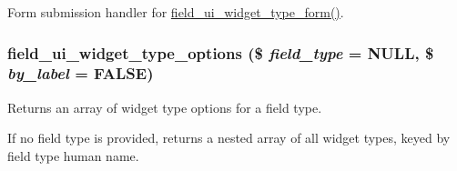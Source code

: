 \label{field__ui_8admin_8inc_a0e5ede7769ff7c3d89a90096f0390c35}
Form submission handler for \hyperlink{group__forms_ga4dda66fe912ff3d86613df64b4a940e0}{field\_\-ui\_\-widget\_\-type\_\-form()}. \hypertarget{field__ui_8admin_8inc_a70b5ea8f37ddfa9d3dffa9c25e51a7da}{
\subsubsection[{field\_\-ui\_\-widget\_\-type\_\-options}]{\setlength{\rightskip}{0pt plus 5cm}field\_\-ui\_\-widget\_\-type\_\-options (\$ {\em field\_\-type} = {\ttfamily NULL}, \/  \$ {\em by\_\-label} = {\ttfamily FALSE})}}
\label{field__ui_8admin_8inc_a70b5ea8f37ddfa9d3dffa9c25e51a7da}
Returns an array of widget type options for a field type.

If no field type is provided, returns a nested array of all widget types, keyed by field type human name. 